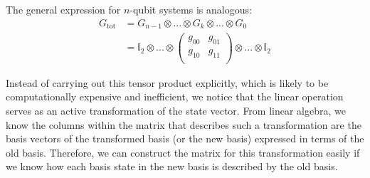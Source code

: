 \documentclass[bibliography=totocnumbered, 10pt]{article}
\theoremstyle{NoticeStyle}
\begin{document}
%
%
The general expression for $n$-qubit systems is analogous:
%
\begin{align}
	G_\text{tot} 
	&= G_{n-1} \otimes ... \otimes G_k \otimes ...\otimes G_0\\
	&= \mathbb{I}_2 \otimes ... \otimes
	\left(
	\begin{smallmatrix}
		g_{00} & g_{01}\\
		g_{10} & g_{11}\\
	\end{smallmatrix}
	\right)
	\otimes ...\otimes \mathbb{I}_2
\end{align}
%

Instead of carrying out this tensor product explicitly, which is likely to be computationally expensive and inefficient, we notice that the linear operation serves as an active transformation of the state vector. From linear algebra, we know the columns within the matrix that describes such a transformation are the basis vectors of the transformed basis (or the new basis) expressed in terms of the old basis. Therefore, we can construct the matrix for this transformation easily if we know how each basis state in the new basis is described by the old basis. 
\end{document}
